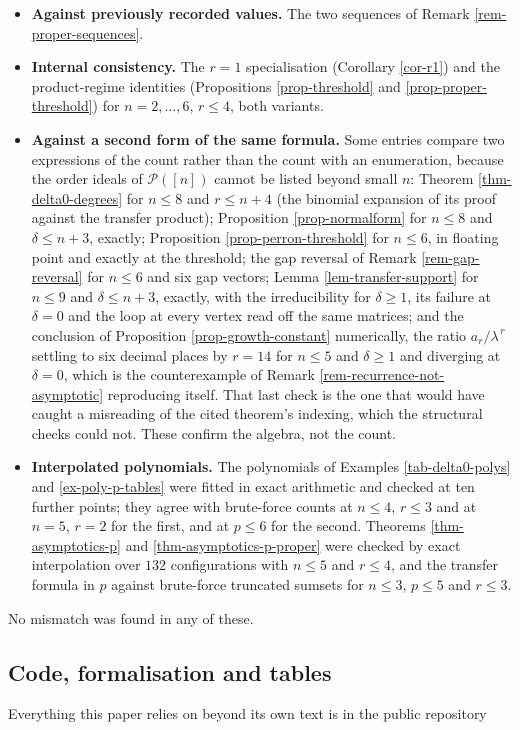 \documentclass[11pt, a4paper, abstract=yes]{scrartcl}
\theoremstyle{definition}
\theoremstyle{remark}
\theoremstyle{plain}
\begin{document}
\begin{itemize}
\item \textbf{Against previously recorded values.} The two sequences of Remark \ref{rem-proper-sequences}.
\item \textbf{Internal consistency.} The \(r=1\) specialisation (Corollary \ref{cor-r1}) and the product-regime
identities (Propositions \ref{prop-threshold} and \ref{prop-proper-threshold}) for \(n=2,\dots,6\),
\(r\le4\), both variants.
\item \textbf{Against a second form of the same formula.} Some entries compare two expressions of the count
rather than the count with an enumeration, because the order ideals of \(\mathcal P([n])\) cannot
be listed beyond small \(n\): Theorem \ref{thm-delta0-degrees} for \(n\le8\) and \(r\le n+4\) (the
binomial expansion of its proof against the transfer product); Proposition \ref{prop-normalform} for
\(n\le8\) and \(\delta\le n+3\), exactly; Proposition \ref{prop-perron-threshold} for \(n\le6\), in
floating point and exactly at the threshold; the gap reversal of Remark \ref{rem-gap-reversal}
for \(n\le6\) and six gap vectors; Lemma \ref{lem-transfer-support} for \(n\le9\) and
\(\delta\le n+3\), exactly, with the irreducibility for \(\delta\ge1\), its failure at
\(\delta=0\) and the loop at every vertex read off the same matrices; and the conclusion of
Proposition \ref{prop-growth-constant} numerically, the ratio \(a_r/\lambda^{\,r}\) settling to six
decimal places by \(r=14\) for \(n\le5\) and \(\delta\ge1\) and diverging at \(\delta=0\), which
is the counterexample of Remark \ref{rem-recurrence-not-asymptotic} reproducing itself. That last
check is the one that would have caught a misreading of the cited theorem's indexing, which the
structural checks could not. These confirm the algebra, not the count.
\item \textbf{Interpolated polynomials.} The polynomials of Examples \ref{tab-delta0-polys} and
\ref{ex-poly-p-tables} were fitted in exact arithmetic and checked at ten further points; they agree
with brute-force counts at \(n\le4\), \(r\le3\) and at \(n=5\), \(r=2\) for the first, and at
\(p\le6\) for the second. Theorems \ref{thm-asymptotics-p} and \ref{thm-asymptotics-p-proper} were
checked by exact interpolation over \(132\) configurations with \(n\le5\) and \(r\le4\), and the
transfer formula in \(p\) against brute-force truncated sumsets for \(n\le3\), \(p\le5\) and
\(r\le3\).
\end{itemize}

No mismatch was found in any of these.
\subsection{Code, formalisation and tables}
\label{sec-availability}
Everything this paper relies on beyond its own text is in the public repository
\end{document}
